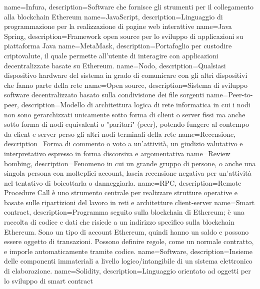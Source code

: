  { name={Infura}, description={Software che fornisce gli strumenti per il collegamento alla blockchain Ethereum} }
 { name={JavaScript}, description={Linguaggio di programmazione per la realizzazione di pagine web interattive} }
 { name={Java Spring}, description={Framework open source per lo sviluppo di applicazioni su piattaforma Java} }
 { name={MetaMask}, description={Portafoglio per custodire criptovalute, il quale permette all'utente di interagire con applicazioni decentralizzate basate su Ethereum.} }
 { name={Nodo}, description={Qualsiasi dispositivo hardware del sistema in grado di comunicare con gli altri dispositivi che fanno parte della rete} }
 { name={Open source}, description={Sistema di sviluppo software decentralizzato basato sulla condivisione dei file sorgenti} }
 { name={Peer-to-peer}, description={Modello di architettura logica di rete informatica in cui i nodi non sono gerarchizzati unicamente sotto forma di client o server fissi ma anche sotto forma di nodi equivalenti o "paritari" (peer), potendo fungere al contempo da client e server perso gli altri nodi terminali della rete} }
 { name={Recensione}, description={Forma di commento o voto a un'attività, un giudizio valutativo e interpretativo espresso in forma discorsiva e argomentativa} }
 { name={Review bombing}, description={Fenomeno in cui un grande gruppo di persone, o anche una singola persona con molteplici account, lascia recensione negativa per un'attività nel tentativo di boicottarla o danneggiarla.} }
 { name={RPC}, description={Remote Procedure Call è uno strumento centrale per realizzare strutture operative e basate sulle ripartizioni del lavoro in reti e architetture client-server} }
 { name={Smart contract}, description={Programma seguito sulla blockchain di Ethereum; è una raccolta di codice e dati che risiede a un indirizzo specifico sulla blockchain Ethereum. Sono un tipo di account Ethereum, quindi hanno un saldo e possono essere oggetto di transazioni. Possono definire regole, come un normale contratto, e imporle automaticamente tramite codice.} }
 { name={Software}, description={Insieme delle componenti immateriali a livello logico/intangibile di un sistema elettronico di elaborazione.} }
 { name={Solidity}, description={Linguaggio orientato ad oggetti per lo sviluppo di smart contract} }
